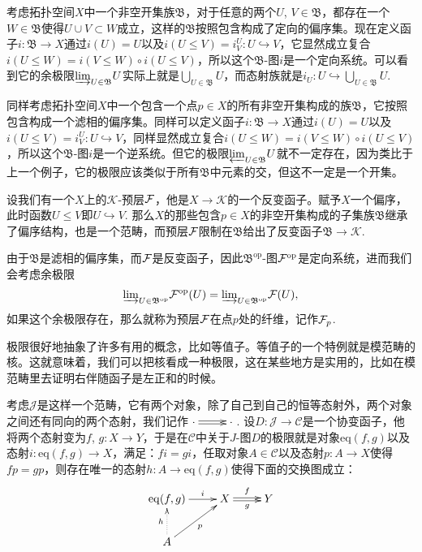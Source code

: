 考虑拓扑空间$X$中一个非空开集族$\mathfrak{B}$，对于任意的两个$U$, $V\in \mathfrak{B}$，都存在一个$W\in \mathfrak{B}$使得$U\cup V\subset W$成立，这样的$\mathfrak{B}$按照包含构成了定向的偏序集。现在定义函子$i:\mathfrak{B}\to X$通过$i(U)=U$以及$i(U\leq V)=i^U_V:U\hookrightarrow V$，它显然成立复合$i(U\leq W)=i(V\leq W)\circ i(U\leq V)$，所以这个$\mathfrak{B}$-图$i$是一个定向系统。可以看到它的余极限${\varinjlim}_{U\in \mathfrak{B}} U$实际上就是$\bigcup_{U\in \mathfrak{B}} U$，而态射族就是$i_U:U\hookrightarrow \bigcup_{U\in \mathfrak{B}} U$.

同样考虑拓扑空间$X$中一个包含一个点$p\in X$的所有非空开集构成的族$\mathfrak{B}$，它按照包含构成一个滤相的偏序集。同样可以定义函子$i:\mathfrak{B}\to X$通过$i(U)=U$以及$i(U\leq V)=i^U_V:U\hookrightarrow V$，同样显然成立复合$i(U\leq W)=i(V\leq W)\circ i(U\leq V)$，所以这个$\mathfrak{B}$-图$i$是一个逆系统。但它的极限${\varprojlim}_{U\in \mathfrak{B}} U$就不一定存在，因为类比于上一个例子，它的极限应该类似于所有$\mathfrak{B}$中元素的交，但这不一定是一个开集。

\para 设我们有一个$X$上的$\mathcal{K}$-预层$\mathcal{F}$，他是$X\to \mathcal{K}$的一个反变函子。赋予$X$一个偏序，此时函数$U\leq V$即$U\hookrightarrow V$. 那么$X$的那些包含$p\in X$的非空开集构成的子集族$\mathfrak{B}$继承了偏序结构，也是一个范畴，而预层$\mathcal{F}$限制在$\mathfrak{B}$给出了反变函子$\mathfrak{B}\to \mathcal{K}$.

由于$\mathfrak{B}$是滤相的偏序集，而$\mathcal{F}$是反变函子，因此$\mathfrak{B}^{\mathrm{op}}$-图$\mathcal{F}^{\mathrm{op}}$是定向系统，进而我们会考虑余极限
\[
	{\varinjlim}_{U\in \mathfrak{B}^{\mathrm{op}}} \mathcal{F}^{\mathrm{op}}(U)={\varinjlim}_{U\in \mathfrak{B}^{\mathrm{op}}} \mathcal{F}(U),
\]
如果这个余极限存在，那么就称为预层$\mathcal{F}$在点$p$处的纤维，记作$\mathcal{F}_p$.

\para 极限很好地抽象了许多有用的概念，比如等值子。等值子的一个特例就是模范畴的核。这就意味着，我们可以把核看成一种极限，这在某些地方是实用的，比如在模范畴里去证明右伴随函子是左正和的时候。

考虑$\mathcal{J}$是这样一个范畴，它有两个对象，除了自己到自己的恒等态射外，两个对象之间还有同向的两个态射，我们记作$\xymatrix{\cdot\ar@<0.3ex>[r] \ar@<-0.3ex>[r]&\cdot}$. 设$D:\mathcal{J}\to\mathcal{C}$是一个协变函子，他将两个态射变为$f$, $g:X\to Y$，于是在$\mathcal{C}$中关于$J$-图$D$的极限就是对象$\mathrm{eq}(f,g)$以及态射$i:\mathrm{eq}(f,g)\to X$，满足：$fi=gi$，任取对象$A\in \mathcal{C}$以及态射$p:A\to X$使得$fp=gp$，则存在唯一的态射$h:A\to \mathrm{eq}(f,g)$使得下面的交换图成立：
\[
\begin{xy}
	\xymatrix{
		\mathrm{eq}(f,g)\ar[r]^-{i}&X\ar@<0.3ex>[r]^-{f} \ar@<-0.3ex>[r]_-{g}&Y\\
		A\ar@{.>}[u]^-{h}\ar[ur]_-{p}
	}
\end{xy}
\]

